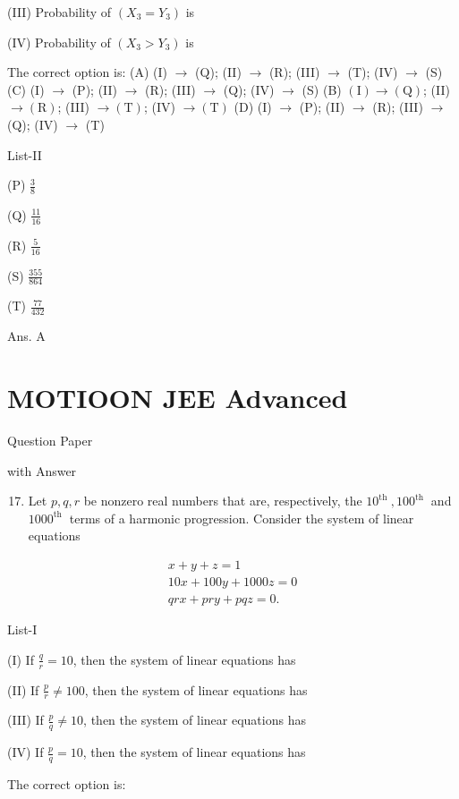 \documentclass[10pt]{article}
\begin{document}
(III) Probability of $\left(X_{3}=Y_{3}\right)$ is

(IV) Probability of $\left(X_{3}>Y_{3}\right)$ is

The correct option is:
(A) (I) $\rightarrow$ (Q); (II) $\rightarrow$ (R); (III) $\rightarrow$ (T); (IV) $\rightarrow$ (S)
(C) (I) $\rightarrow$ (P); (II) $\rightarrow$ (R); (III) $\rightarrow$ (Q); (IV) $\rightarrow$ (S)
(B) $(\mathrm{I}) \rightarrow(\mathrm{Q})$; (II) $\rightarrow(\mathrm{R})$; (III) $\rightarrow(\mathrm{T})$; (IV) $\rightarrow(\mathrm{T})$
(D) (I) $\rightarrow$ (P); (II) $\rightarrow$ (R); (III) $\rightarrow$ (Q); (IV) $\rightarrow$ (T)

List-II

(P) $\frac{3}{8}$

(Q) $\frac{11}{16}$

(R) $\frac{5}{16}$

(S) $\frac{355}{864}$

(T) $\frac{77}{432}$

Ans. A

\section{MOTIOON JEE Advanced}
Question Paper

with Answer

\begin{enumerate}
  \setcounter{enumi}{16}
  \item Let $p, q, r$ be nonzero real numbers that are, respectively, the $10^{\text {th }}, 100^{\text {th }}$ and $1000^{\text {th }}$ terms of a harmonic progression. Consider the system of linear equations
\end{enumerate}

$$
\begin{gathered}
x+y+z=1 \\
10 x+100 y+1000 z=0 \\
q r x+p r y+p q z=0 .
\end{gathered}
$$

List-I

(I) If $\frac{q}{r}=10$, then the system of linear equations has

(II) If $\frac{p}{r} \neq 100$, then the system of linear equations has

(III) If $\frac{p}{q} \neq 10$, then the system of linear equations has

(IV) If $\frac{p}{q}=10$, then the system of linear equations has

The correct option is:
\end{document}
